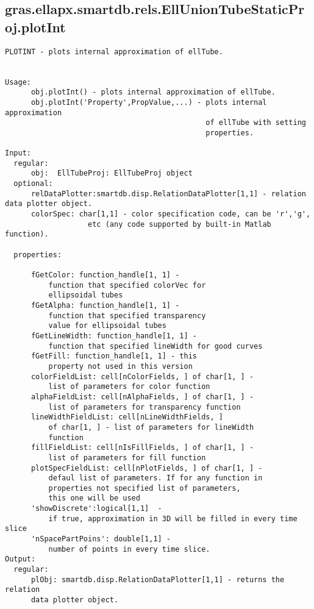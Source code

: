 \subsection{\texorpdfstring{gras.ellapx.smartdb.rels.EllUnionTubeStaticProj.plotInt}{plotInt}}\label{method:gras.ellapx.smartdb.rels.EllUnionTubeStaticProj.plotInt}
\begin{verbatim}
PLOTINT - plots internal approximation of ellTube.


Usage:
      obj.plotInt() - plots internal approximation of ellTube.
      obj.plotInt('Property',PropValue,...) - plots internal approximation
                                              of ellTube with setting
                                              properties.

Input:
  regular:
      obj:  EllTubeProj: EllTubeProj object
  optional:
      relDataPlotter:smartdb.disp.RelationDataPlotter[1,1] - relation data plotter object.
      colorSpec: char[1,1] - color specification code, can be 'r','g',
                   etc (any code supported by built-in Matlab function).

  properties:

      fGetColor: function_handle[1, 1] -
          function that specified colorVec for
          ellipsoidal tubes
      fGetAlpha: function_handle[1, 1] -
          function that specified transparency
          value for ellipsoidal tubes
      fGetLineWidth: function_handle[1, 1] -
          function that specified lineWidth for good curves
      fGetFill: function_handle[1, 1] - this
          property not used in this version
      colorFieldList: cell[nColorFields, ] of char[1, ] -
          list of parameters for color function
      alphaFieldList: cell[nAlphaFields, ] of char[1, ] -
          list of parameters for transparency function
      lineWidthFieldList: cell[nLineWidthFields, ]
          of char[1, ] - list of parameters for lineWidth
          function
      fillFieldList: cell[nIsFillFields, ] of char[1, ] -
          list of parameters for fill function
      plotSpecFieldList: cell[nPlotFields, ] of char[1, ] -
          defaul list of parameters. If for any function in
          properties not specified list of parameters,
          this one will be used
      'showDiscrete':logical[1,1]  -
          if true, approximation in 3D will be filled in every time slice
      'nSpacePartPoins': double[1,1] -
          number of points in every time slice.
Output:
  regular:
      plObj: smartdb.disp.RelationDataPlotter[1,1] - returns the relation
      data plotter object.
\end{verbatim}

